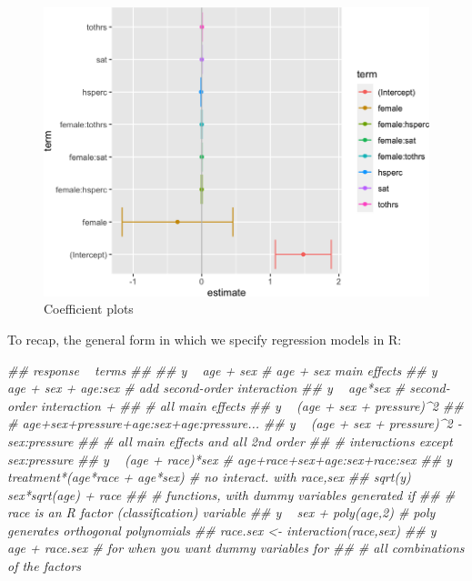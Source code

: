 \documentclass[]{book}
\newenvironment{Shaded}{\begin{snugshade}}{\end{snugshade}}
\newcommand{\CommentTok}[1]{\textcolor[rgb]{0.56,0.35,0.01}{\textit{#1}}}
\begin{document}
\begin{figure}

{\centering \includegraphics[width=0.8\linewidth]{MEM5220_R_files/figure-latex/fig17-1} 

}

\caption{Coefficient plots}\label{fig:fig17}
\end{figure}

To recap, the general form in which we specify regression models in R:

\begin{Shaded}
\begin{Highlighting}[]
\CommentTok{## response ~ terms}
\CommentTok{## }
\CommentTok{## y ~ age + sex            # age + sex main effects}
\CommentTok{## y ~ age + sex + age:sex  # add second-order interaction}
\CommentTok{## y ~ age*sex              # second-order interaction +}
\CommentTok{##                          # all main effects}
\CommentTok{## y ~ (age + sex + pressure)^2}
\CommentTok{##                          # age+sex+pressure+age:sex+age:pressure...}
\CommentTok{## y ~ (age + sex + pressure)^2 - sex:pressure}
\CommentTok{##                          # all main effects and all 2nd order}
\CommentTok{##                          # interactions except sex:pressure}
\CommentTok{## y ~ (age + race)*sex     # age+race+sex+age:sex+race:sex}
\CommentTok{## y ~ treatment*(age*race + age*sex) # no interact. with race,sex}
\CommentTok{## sqrt(y) ~ sex*sqrt(age) + race}
\CommentTok{## # functions, with dummy variables generated if}
\CommentTok{## # race is an R factor (classification) variable}
\CommentTok{## y ~ sex + poly(age,2)    # poly generates orthogonal polynomials}
\CommentTok{## race.sex <- interaction(race,sex)}
\CommentTok{## y ~ age + race.sex       # for when you want dummy variables for}
\CommentTok{##                          # all combinations of the factors}
\end{Highlighting}
\end{Shaded}
\end{document}
